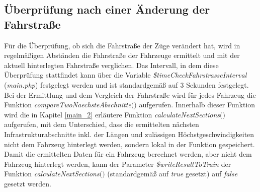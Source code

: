 \subsection{Überprüfung nach einer Änderung der Fahrstraße}
Für die Überprüfung, ob sich die Fahrstraße der Züge verändert hat, wird in regelmäßigen Abständen die Fahrstraße der Fahrzeuge ermittelt und mit der aktuell hinterlegten Fahrstraße verglichen. Das Intervall, in dem diese Überprüfung stattfindet kann über die Variable \textit{\$timeCheckFahrstrasseInterval} (\textit{main.php}) festgelegt werden und ist standardgemäß auf 3 Sekunden festgelegt. Bei der Ermittlung und dem Vergleich der Fahrstraße wird für jedes Fahrzeug die Funktion \textit{compareTwoNaechsteAbschnitte$($$)$} aufgerufen. Innerhalb dieser Funktion wird die in Kapitel \ref{main_2} erläutere Funktion \textit{calculateNextSections$($$)$} aufgerufen, mit dem Unterschied, dass die ermittelten nächsten Infrastrukturabschnitte inkl. der Längen und zulässigen Höchstgeschwindigkeiten nicht dem Fahrzeug hinterlegt werden, sondern lokal in der Funktion gespeichert. Damit die ermittelten Daten für ein Fahrzeug berechnet werden, aber nicht dem Fahrzeug hinterlegt werden, kann der Parameter \textit{\$writeResultToTrain} der Funktion \textit{calculateNextSections$($$)$} (standardgemäß auf \textit{true} gesetzt) auf \textit{false} gesetzt werden.
